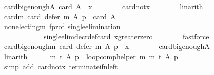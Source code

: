 \begin{isabellebody}
\ card{\isacharunderscore}{\kern0pt}big{\isacharunderscore}{\kern0pt}enough{\isacharunderscore}{\kern0pt}A{\isacharcolon}{\kern0pt}\ {\isachardoublequoteopen}card\ A\ {\isachargreater}{\kern0pt}\ x{\isachardoublequoteclose}\isanewline
\ \ \ \ \ \ \isamarkupfalse%
\ card{\isacharunderscore}{\kern0pt}not{\isacharunderscore}{\kern0pt}x\isanewline
\ \ \ \ \ \ \isamarkupfalse%
\ linarith\isanewline
\ \ \ \ \isamarkupfalse%
\ card{\isacharunderscore}{\kern0pt}m{\isacharcolon}{\kern0pt}\ {\isachardoublequoteopen}card\ {\isacharparenleft}{\kern0pt}defer\ m\ A\ p{\isacharparenright}{\kern0pt}\ {\isacharequal}{\kern0pt}\ card\ A\ {\isacharminus}{\kern0pt}\ {}{\isachardoublequoteclose}\isanewline
\ \ \ \ \ \ \isamarkupfalse%
\ non{\isacharunderscore}{\kern0pt}electing{\isacharunderscore}{\kern0pt}m\ f{\isacharunderscore}{\kern0pt}prof\ single{\isacharunderscore}{\kern0pt}elimination\isanewline
\ \ \ \ \ \ \ \ \ \ \ \ single{\isacharunderscore}{\kern0pt}elim{\isacharunderscore}{\kern0pt}decr{\isacharunderscore}{\kern0pt}def{\isacharunderscore}{\kern0pt}card{}\ x{\isacharunderscore}{\kern0pt}greater{\isacharunderscore}{\kern0pt}zero\isanewline
\ \ \ \ \ \ \isamarkupfalse%
\ fastforce\isanewline
\ \ \ \ \isamarkupfalse%
\ card{\isacharunderscore}{\kern0pt}big{\isacharunderscore}{\kern0pt}enough{\isacharunderscore}{\kern0pt}m{\isacharcolon}{\kern0pt}\ {\isachardoublequoteopen}card\ {\isacharparenleft}{\kern0pt}defer\ m\ A\ p{\isacharparenright}{\kern0pt}\ {\isasymge}\ x{\isachardoublequoteclose}\isanewline
\ \ \ \ \ \ \isamarkupfalse%
\ card{\isacharunderscore}{\kern0pt}big{\isacharunderscore}{\kern0pt}enough{\isacharunderscore}{\kern0pt}A\isanewline
\ \ \ \ \ \ \isamarkupfalse%
\ linarith\isanewline
\ \ \ \ \isamarkupfalse%
\ {\isachardoublequoteopen}{\isacharparenleft}{\kern0pt}m\ {\isasymcirclearrowleft}\isactrlsub t{\isacharparenright}{\kern0pt}\ A\ p\ {\isacharequal}{\kern0pt}\ {\isacharparenleft}{\kern0pt}loop{\isacharunderscore}{\kern0pt}comp{\isacharunderscore}{\kern0pt}helper\ m\ m\ t{\isacharparenright}{\kern0pt}\ A\ p{\isachardoublequoteclose}\isanewline
\ \ \ \ \ \ \isamarkupfalse%
\ {\isacharparenleft}{\kern0pt}simp\ add{\isacharcolon}{\kern0pt}\ card{\isacharunderscore}{\kern0pt}not{\isacharunderscore}{\kern0pt}x\ terminate{\isacharunderscore}{\kern0pt}if{\isacharunderscore}{\kern0pt}n{\isacharunderscore}{\kern0pt}left{\isacharparenright}{\kern0pt}\isanewline
\ \ \ \ \isamarkupfalse%

\end{isabellebody}
